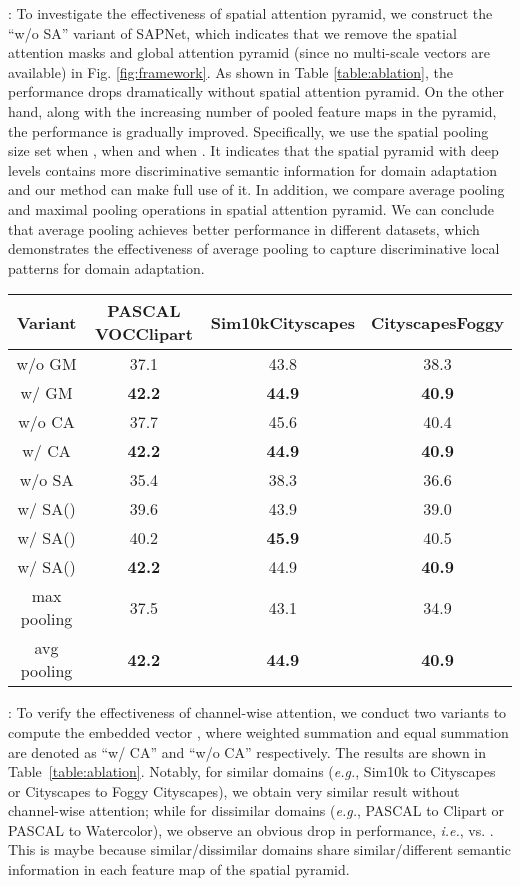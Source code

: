 \documentclass[runningheads]{llncs}
\def\eg{{\em e.g.}}
\def\ie{{\em i.e.}}
\begin{document}
{:} To investigate the effectiveness of spatial attention pyramid, we construct the ``w/o SA'' variant of SAPNet, which indicates that we remove the spatial attention masks and global attention pyramid (since no multi-scale vectors are available) in Fig. \ref{fig:framework}. As shown in Table \ref{table:ablation}, the performance drops dramatically without spatial attention pyramid.  On the other hand, along with the increasing number of pooled feature maps in the pyramid, the performance is gradually improved. Specifically, we use the spatial pooling size set  when ,  when  and  when . It indicates that the spatial pyramid with deep levels contains more discriminative semantic information for domain adaptation and our method can make full use of it. In addition, we compare average pooling and maximal pooling operations in spatial attention pyramid. We can conclude that average pooling achieves better performance in different datasets, which demonstrates the effectiveness of average pooling to capture discriminative local patterns for domain adaptation.
\begin{table*}[t]
\centering
\caption{Effectiveness of important aspects in SAPNet.}
\label{table:ablation}
\setlength{\tabcolsep}{3.5pt}
\begin{tabular}{c|c|c|c}
\hline
Variant & PASCAL VOCClipart & Sim10kCityscapes & CityscapesFoggy \\
\hline
w/o GM &37.1 &43.8 &38.3  \\
w/ GM   &\bf42.2 &\bf44.9 &\bf40.9  \\
\hline\hline
w/o CA & 37.7 & 45.6 & 40.4 \\
w/ CA   & \bf42.2 & \bf44.9 & \bf40.9  \\
\hline\hline
w/o SA & 35.4 & 38.3 & 36.6  \\
w/ SA()  & 39.6 & 43.9 & 39.0 \\
w/ SA()  & 40.2 & \bf45.9 & 40.5 \\
w/ SA() & \bf42.2 & 44.9 & \bf40.9 \\
\hline\hline
max pooling & 37.5 & 43.1 & 34.9 \\
avg pooling & \bf42.2 & \bf44.9 & \bf40.9 \\
\hline
\end{tabular}
\end{table*}

{:}
To verify the effectiveness of channel-wise attention, we conduct two variants to compute the embedded vector , where weighted summation  and equal summation  are denoted as ``w/ CA'' and ``w/o CA'' respectively. The results are shown in Table~\ref{table:ablation}. Notably, for similar domains (\eg, Sim10k to Cityscapes or Cityscapes to Foggy Cityscapes), we obtain very similar result without channel-wise attention; while for dissimilar domains (\eg, PASCAL to Clipart or PASCAL to Watercolor), we observe an obvious drop in performance, \ie,  vs. . This is maybe because similar/dissimilar domains share similar/different semantic information in each feature map of the spatial pyramid.
\end{document}
